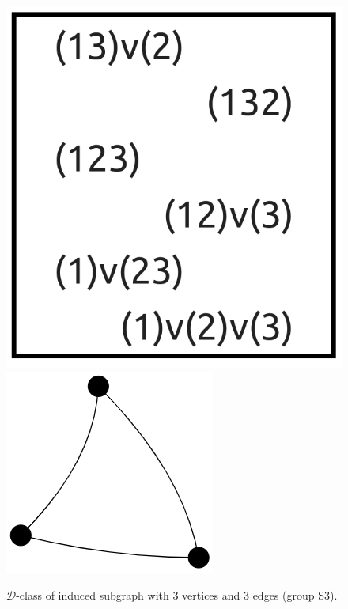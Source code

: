\begin{appendices}
\begin{figure}[H]
\includegraphics[scale=0.08]{images/x1/x1_3v_3e.png}
\includegraphics[scale=0.15]{images/x1/x1_3v_3e_vis.png}
\caption{$\mathcal{D}$-class of induced subgraph with 3 vertices and 3 edges (group S3).}
\end{figure}


\end{appendices}

